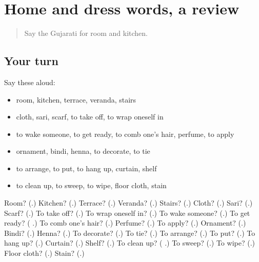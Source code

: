 \section[(dialogue)]{Home and dress words, a review}

\label{lesson:GU-R158-review-153-158}



\begin{quote}
Say the Gujarati for room and kitchen.
\end{quote}

\subsection*{Your turn}
Say these aloud:

\begin{itemize}
\raggedright
  \item room, kitchen, terrace, veranda, stairs
  \item cloth, sari, scarf, to take off, to wrap oneself in
  \item to wake someone, to get ready, to comb one's hair, perfume, to apply
  \item ornament, bindi, henna, to decorate, to tie
  \item to arrange, to put, to hang up, curtain, shelf
  \item to clean up, to sweep, to wipe, floor cloth, stain
\end{itemize}

\begin{tcolorbox}[breakable,colback=teal!4,colframe=teal!35!black,title={Before you move on}]
Room? (\textbf{}.) Kitchen? (\textbf{}.) Terrace? (\textbf{}.) Veranda? (\textbf{}.) Stairs? (\textbf{}.) Cloth? (\textbf{}.) Sari? (\textbf{}.) Scarf? (\textbf{}.) To take off? (\textbf{}.) To wrap oneself in? (\textbf{}.) To wake someone? (\textbf{}.) To get ready? (\textbf{ }.) To comb one's hair? (\textbf{}.) Perfume? (\textbf{}.) To apply? (\textbf{}.) Ornament? (\textbf{}.) Bindi? (\textbf{}.) Henna? (\textbf{}.) To decorate? (\textbf{}.) To tie? (\textbf{}.) To arrange? (\textbf{}.) To put? (\textbf{}.) To hang up? (\textbf{}.) Curtain? (\textbf{}.) Shelf? (\textbf{}.) To clean up? (\textbf{ }.) To sweep? (\textbf{}.) To wipe? (\textbf{}.) Floor cloth? (\textbf{}.) Stain? (\textbf{}.)
\end{tcolorbox}

